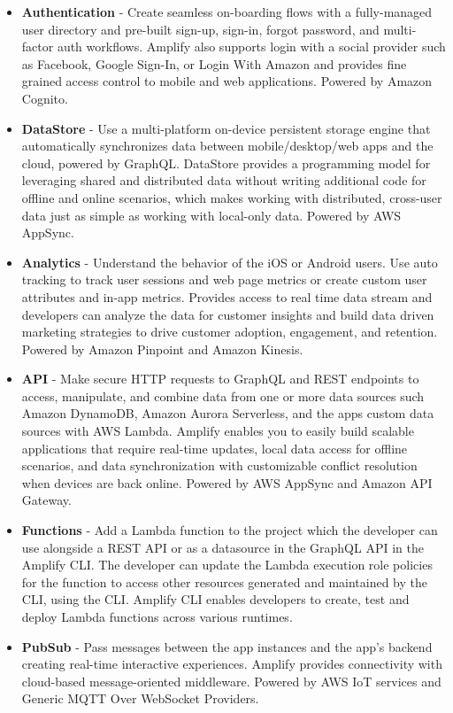 \begin{itemize}
	\item \textbf{Authentication} - Create seamless on-boarding flows with a fully-managed user directory and pre-built sign-up, sign-in, forgot password, and multi-factor auth workflows. Amplify also supports login with a social provider such as Facebook, Google Sign-In, or Login With Amazon and provides fine grained access control to mobile and web applications. Powered by Amazon Cognito.
	\item \textbf{DataStore} - Use a multi-platform on-device persistent storage engine that automatically synchronizes data between mobile/desktop/web apps and the cloud, powered by GraphQL. DataStore provides a programming model for leveraging shared and distributed data without writing additional code for offline and online scenarios, which makes working with distributed, cross-user data just as simple as working with local-only data. Powered by AWS AppSync.
	\item \textbf{Analytics} - Understand the behavior of the iOS or Android users. Use auto tracking to track user sessions and web page metrics or create custom user attributes and in-app metrics. Provides access to real time data stream and developers can analyze the data for customer insights and build data driven marketing strategies to drive customer adoption, engagement, and retention. Powered by Amazon Pinpoint and Amazon Kinesis.
	\item \textbf{API } - Make secure HTTP requests to GraphQL and REST endpoints to access, manipulate, and combine data from one or more data sources such Amazon DynamoDB, Amazon Aurora Serverless, and the apps custom data sources with AWS Lambda. Amplify enables you to easily build scalable applications that require real-time updates, local data access for offline scenarios, and data synchronization with customizable conflict resolution when devices are back online. Powered by AWS AppSync and Amazon API Gateway.
	\item \textbf{Functions} - Add a Lambda function to the project which the developer can use alongside a REST API or as a datasource in the GraphQL API in the Amplify CLI. The developer can update the Lambda execution role policies for the function to access other resources generated and maintained by the CLI, using the CLI. Amplify CLI enables developers to create, test and deploy Lambda functions across various runtimes.
	\item \textbf{PubSub} - Pass messages between the app instances and the app's backend creating real-time interactive experiences. Amplify provides connectivity with cloud-based message-oriented middleware. Powered by AWS IoT services and Generic MQTT Over WebSocket Providers.

\end{itemize}
